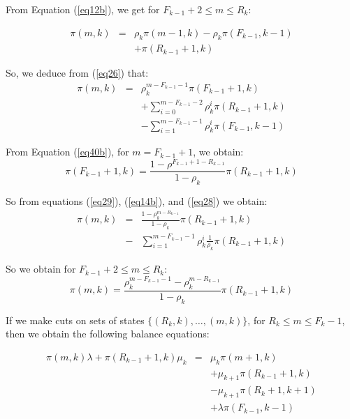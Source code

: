\documentclass[conference]{IEEEtran}
\begin{document}
\noindent From Equation (\ref{eq12b}), we get for  $F_{k-1}+2 \leq m \leq R_{k}$:


\begin{eqnarray}
\pi(m,k) &=& \rho_k \pi(m-1,k)-\rho_k \pi(F_{k-1},k-1) \nonumber\\
&&+ \pi(R_{k-1}+1,k)
\label{eq26}
\end{eqnarray}



\noindent So, we deduce from (\ref{eq26}) that:
\begin{eqnarray}
\pi(m,k)&=& \rho_k^{m-F_{k-1}-1}\pi(F_{k-1}+1,k) \nonumber\\
&&+
\sum_{i=0}^{m-F_{k-1}-2} \rho_k^i\pi(R_{k-1}+1,k)  \\&& -\sum_{i=1}^{m-F_{k-1}-1} \rho_k^i \pi(F_{k-1},k-1)
\label{eq28}
\end{eqnarray}


From Equation (\ref{eq40b}), for $m=F_{k-1}+1$, we obtain:
\begin{equation}
\pi(F_{k-1}+1,k)=\frac{1-\rho^{ F_{k-1}+1-R_{k-1}} }{1-\rho_k}\pi(R_{k-1}+1,k)
\label{eq29}
\end{equation}

So from equations (\ref{eq29}), (\ref{eq14b}), and (\ref{eq28})  we obtain:
\begin{eqnarray}
\pi(m,k)&=&\frac{1-\rho_k^{m-R_{k-1}} } {1-\rho_k} \pi(R_{k-1}+1,k) \nonumber\\
&-& \sum_{i=1}^{m-F_{k-1}-1} \rho_k^i \frac{1}{\rho_k} \pi(R_{k-1}+1,k)
\label{eq30}
\end{eqnarray}

So we obtain for $F_{k-1}+2 \leq m \leq R_{k}$:
\begin{equation}
\pi(m,k)= \frac{\rho_k^{m-F_{k-1}-1}-\rho_k^{m-R_{k-1}} } {1-\rho_k} \pi(R_{k-1}+1,k)
\label{eq31}
\end{equation}


If we make cuts on sets of states $\{(R_{k},k),\ldots, (m,k)\}$, for $R_k \leq m \leq F_k-1$, then we obtain the following balance equations:

\begin{eqnarray}
\pi(m,k)\lambda +   \pi(R_{k-1}+1,k) \mu_k &=& \mu_k \pi(m+1,k) \nonumber\\
&&+  \mu_{k+1} \pi(R_{k-1}+1,k) \nonumber \\
&&- \mu_{k+1} \pi(R_{k}+1, k+1) \nonumber \\
&&+  \lambda \pi(F_{k-1}, k-1)
\label{eq32b}
\end{eqnarray}
\end{document}
